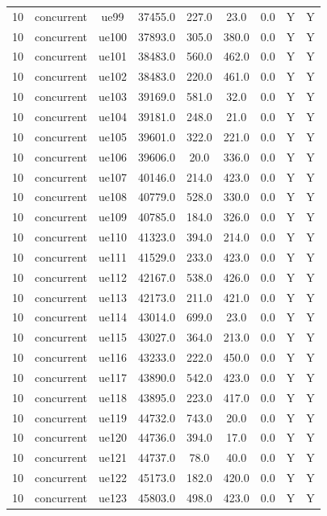 \begin{table}[ht]
\begin{tabular}{|c|c|c|c|c|c|c|c|c|}
10 & concurrent & ue99 & 37455.0 & 227.0 & 23.0 & 0.0 & Y & Y \\
10 & concurrent & ue100 & 37893.0 & 305.0 & 380.0 & 0.0 & Y & Y \\
10 & concurrent & ue101 & 38483.0 & 560.0 & 462.0 & 0.0 & Y & Y \\
10 & concurrent & ue102 & 38483.0 & 220.0 & 461.0 & 0.0 & Y & Y \\
10 & concurrent & ue103 & 39169.0 & 581.0 & 32.0 & 0.0 & Y & Y \\
10 & concurrent & ue104 & 39181.0 & 248.0 & 21.0 & 0.0 & Y & Y \\
10 & concurrent & ue105 & 39601.0 & 322.0 & 221.0 & 0.0 & Y & Y \\
10 & concurrent & ue106 & 39606.0 & 20.0 & 336.0 & 0.0 & Y & Y \\
10 & concurrent & ue107 & 40146.0 & 214.0 & 423.0 & 0.0 & Y & Y \\
10 & concurrent & ue108 & 40779.0 & 528.0 & 330.0 & 0.0 & Y & Y \\
10 & concurrent & ue109 & 40785.0 & 184.0 & 326.0 & 0.0 & Y & Y \\
10 & concurrent & ue110 & 41323.0 & 394.0 & 214.0 & 0.0 & Y & Y \\
10 & concurrent & ue111 & 41529.0 & 233.0 & 423.0 & 0.0 & Y & Y \\
10 & concurrent & ue112 & 42167.0 & 538.0 & 426.0 & 0.0 & Y & Y \\
10 & concurrent & ue113 & 42173.0 & 211.0 & 421.0 & 0.0 & Y & Y \\
10 & concurrent & ue114 & 43014.0 & 699.0 & 23.0 & 0.0 & Y & Y \\
10 & concurrent & ue115 & 43027.0 & 364.0 & 213.0 & 0.0 & Y & Y \\
10 & concurrent & ue116 & 43233.0 & 222.0 & 450.0 & 0.0 & Y & Y \\
10 & concurrent & ue117 & 43890.0 & 542.0 & 423.0 & 0.0 & Y & Y \\
10 & concurrent & ue118 & 43895.0 & 223.0 & 417.0 & 0.0 & Y & Y \\
10 & concurrent & ue119 & 44732.0 & 743.0 & 20.0 & 0.0 & Y & Y \\
10 & concurrent & ue120 & 44736.0 & 394.0 & 17.0 & 0.0 & Y & Y \\
10 & concurrent & ue121 & 44737.0 & 78.0 & 40.0 & 0.0 & Y & Y \\
10 & concurrent & ue122 & 45173.0 & 182.0 & 420.0 & 0.0 & Y & Y \\
10 & concurrent & ue123 & 45803.0 & 498.0 & 423.0 & 0.0 & Y & Y \\

\end{tabular}
\end{table}
